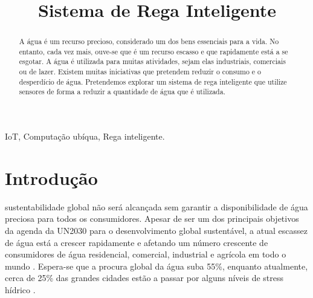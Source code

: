\documentclass[conference]{IEEEtran}
\begin{document}
\title{Sistema de Rega Inteligente}

\author{
\and
{}
}

\maketitle

\begin{abstract}
A água é um recurso precioso, considerado um dos bens essenciais para a vida. 
No entanto, cada vez mais, ouve-se que é um recurso escasso e que rapidamente 
está a se esgotar. A água é utilizada para muitas atividades, sejam elas industriais, 
comerciais ou de lazer. Existem muitas iniciativas que pretendem reduzir o 
consumo e o desperdício de água. Pretendemos explorar um sistema de rega 
inteligente que utilize sensores de forma a reduzir a quantidade de água que 
é utilizada. \\
\end{abstract}

\begin{IEEEkeywords}
IoT, Computação ubíqua, Rega inteligente.
\end{IEEEkeywords}

\section{Introdução}

 sustentabilidade global não será alcançada sem garantir a 
disponibilidade de água preciosa para todos os consumidores. Apesar de ser um 
dos principais objetivos da agenda da UN2030 \cite{un2015agenda} para o desenvolvimento 
global sustentável, a atual escassez de água está a crescer rapidamente e 
afetando um número crescente de consumidores de água residencial, comercial, 
industrial e agrícola em todo o mundo \cite{mishra2021water}. Espera-se que a 
procura global da água suba 55\%, enquanto atualmente, cerca de 25\% das grandes 
cidades estão a passar por alguns níveis de stress hídrico \cite{josefine2021differentiated}.
\end{document}
